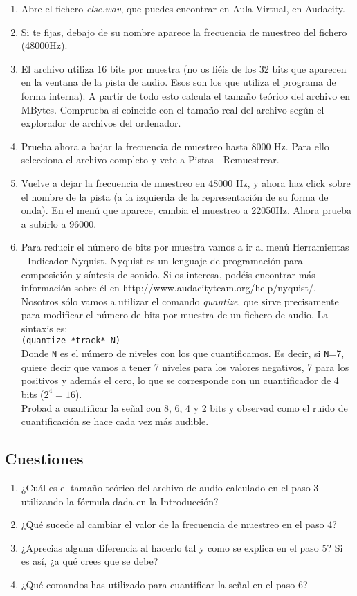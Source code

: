 \documentclass[es,practica]{uah}
\begin{document}
\begin{enumerate}
\item Abre el fichero {\em else.wav}, que puedes encontrar en Aula Virtual, en Audacity. 
\item Si te fijas, debajo de su nombre aparece la frecuencia de muestreo del fichero (48000Hz). 
\item El archivo utiliza 16 bits por muestra (no os fiéis de los 32 bits que aparecen en la ventana de la pista de audio. Esos son los que utiliza el programa de forma interna). A partir de todo esto calcula el tamaño teórico del archivo en MBytes. Comprueba si coincide con el tamaño real del archivo según el explorador de archivos del ordenador. 
\item Prueba ahora a bajar la frecuencia de muestreo hasta 8000 Hz. Para ello selecciona el archivo completo y vete a Pistas - Remuestrear. 
\item Vuelve a dejar la frecuencia de muestreo en 48000 Hz, y ahora haz click sobre el nombre de la pista (a la izquierda de la representación de su forma de onda). En el menú que aparece, cambia el muestreo a 22050Hz. Ahora prueba a subirlo a 96000.
\item Para reducir el número de bits por muestra vamos a ir al menú Herramientas - Indicador Nyquist. Nyquist es un lenguaje de programación para composición y síntesis de sonido. Si os interesa, podéis encontrar más información sobre él en http://www.audacityteam.org/help/nyquist/. Nosotros sólo vamos a utilizar el comando \emph{quantize}, que sirve precisamente para modificar el número de bits por muestra de un fichero de audio. La sintaxis es:\\
	\texttt{(quantize *track* N)}\\
	Donde \texttt{N} es el número de niveles con los que cuantificamos. Es decir, si \texttt{N}=7, quiere decir que vamos a tener 7 niveles para los valores negativos, 7 para los positivos y además el cero, lo que se corresponde con un cuantificador de 4 bits ($2^4 = 16$).\\
	Probad a cuantificar la señal con 8, 6, 4 y 2 bits y observad como el ruido de cuantificación se hace cada vez más audible.
\end{enumerate}


\subsection{Cuestiones}
\begin{enumerate}
\item ¿Cuál es el tamaño teórico del archivo de audio calculado en el paso 3 utilizando la fórmula dada en la Introducción?
\item ¿Qué sucede al cambiar el valor de la frecuencia de muestreo en el paso 4?
\item ¿Aprecias alguna diferencia al hacerlo tal y como se explica en el paso 5? Si es así, ¿a qué crees que se debe?
\item ¿Qué comandos has utilizado para cuantificar la señal en el paso 6?
\end{enumerate}
\end{document}
